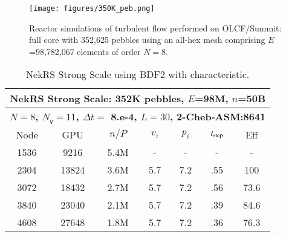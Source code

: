\begin{figure}[!ht]
\centering
\texttt{[image: figures/350K\_peb.png]}
 \caption{\label{fig:350k} Reactor simulations of turbulent flow performed 
  on OLCF/Summit:
  full core with 352,625 pebbles using an all-hex mesh comprising
  $E$=98,782,067 elements of order $N=8$.}
\end{figure}


\begin{table}
\footnotesize
\begin{center}
\begin{tabular}{|c|c|c|c|c|c|c|}
  \hline
  \multicolumn{7}{|c|}{{\bf NekRS Strong Scale: 352K pebbles, $E$=98M, $n$=50B}}\\
  \hline
  \multicolumn{7}{|c|}{{\bf $N=8$, $N_q=11$, $\Delta t=$ 8.e-4, $L=30$, 2-Cheb-ASM:8641}}\\
  \hline
  Node & GPU  & $n/P$ &  $v_i$ & $p_i$ & $t_{\rm step}$ & Eff \\
  \hline
  1536   &  9216  &   5.4M   &  -   &   -  &    -   &      -       \\%
  2304   &  13824 &   3.6M   &   5.7&   7.2&    .55 &    100       \\%
  3072   &  18432 &   2.7M   &   5.7&   7.2&    .56 &    73.6      \\%
  3840   &  23040 &   2.1M   &   5.7&   7.2&    .39 &    84.6      \\%
  4608   &  27648 &   1.8M   &   5.7&   7.2&    .36 &    76.3      \\%
 \hline
 \end{tabular}
\end{center}
 \caption{\label{peb35k-strong}
 NekRS Strong Scale using BDF2 with characteristic.}
\end{table}




